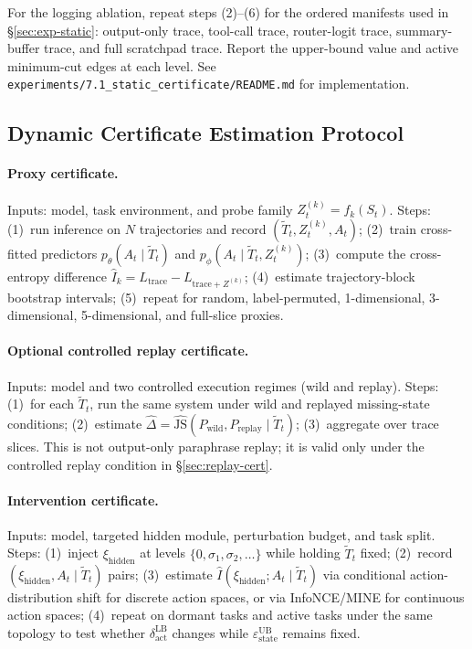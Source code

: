 \documentclass{article}
\begin{document}
For the logging ablation, repeat steps (2)--(6) for the ordered manifests used in \S\ref{sec:exp-static}: output-only trace, tool-call trace, router-logit trace, summary-buffer trace, and full scratchpad trace. Report the upper-bound value and active minimum-cut edges at each level. See \texttt{experiments/7.1\_static\_certificate/README.md} for implementation.

\subsection{Dynamic Certificate Estimation Protocol}

\paragraph{Proxy certificate.} Inputs: model, task environment, and probe family $Z_t^{(k)} = f_k(S_t)$. Steps: (1)~run inference on $N$ trajectories and record $(\tilde T_t, Z_t^{(k)}, A_t)$; (2)~train cross-fitted predictors $p_\theta(A_t \mid \tilde T_t)$ and $p_\phi(A_t \mid \tilde T_t, Z_t^{(k)})$; (3)~compute the cross-entropy difference $\hat I_k = L_\text{trace} - L_{\text{trace}+Z^{(k)}}$; (4)~estimate trajectory-block bootstrap intervals; (5)~repeat for random, label-permuted, 1-dimensional, 3-dimensional, 5-dimensional, and full-slice proxies.

\paragraph{Optional controlled replay certificate.} Inputs: model and two controlled execution regimes (wild and replay). Steps: (1)~for each $\tilde T_t$, run the same system under wild and replayed missing-state conditions; (2)~estimate $\hat\Delta = \hat{\mathrm{JS}}(P_\text{wild}, P_\text{replay} \mid \tilde T_t)$; (3)~aggregate over trace slices. This is not output-only paraphrase replay; it is valid only under the controlled replay condition in \S\ref{sec:replay-cert}.

\paragraph{Intervention certificate.} Inputs: model, targeted hidden module, perturbation budget, and task split. Steps: (1)~inject $\xi_\text{hidden}$ at levels $\{0, \sigma_1, \sigma_2, \ldots\}$ while holding $\tilde T_t$ fixed; (2)~record $(\xi_\text{hidden}, A_t \mid \tilde T_t)$ pairs; (3)~estimate $\hat I(\xi_\text{hidden}; A_t \mid \tilde T_t)$ via conditional action-distribution shift for discrete action spaces, or via InfoNCE/MINE for continuous action spaces; (4)~repeat on dormant tasks and active tasks under the same topology to test whether $\delta_\text{act}^\text{LB}$ changes while $\varepsilon_\text{state}^\text{UB}$ remains fixed.
\end{document}
